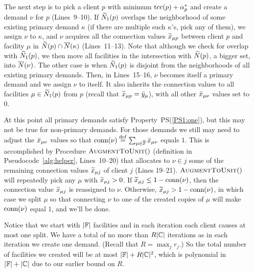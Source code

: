 \documentclass[11pt]{article}
\begin{document}


The next step is to pick a client $p$ with minimum
$\textrm{tcc}(p)+\alpha_p^\ast$ and create a demand $\nu$ for $p$
(Lines~9--10). If ${\widetilde N}_1(p)$ overlaps the neighborhood
of some existing primary demand $\kappa$ (if there are
multiple such $\kappa$'s, pick any of them), we assign $\nu$
to $\kappa$, and $\nu$ acquires all the connection values
${\widetilde x}_{\mu p}$ between client $p$ and facility $\mu$ in
${\widetilde N}(p)\cap {\overline{N}}(\kappa)$ (Lines~11--13). Note that
although we check for overlap with ${\widetilde N}_1(p)$, we then
move all facilities in the intersection with ${\widetilde N}(p)$,
a bigger set, into ${\overline{N}}(\nu)$.  The other case is when
${\widetilde N}_1(p)$ is disjoint from the neighborhoods of all
existing primary demands. Then, in Lines~15--16, $\nu$
becomes itself a primary demand and we assign $\nu$ to
itself. It also inherits the connection values to all
facilities $\mu\in{\widetilde N}_1(p)$ from $p$ (recall that
${\widetilde x}_{\mu p} = {\bar y}_{\mu}$), with all other
${\bar x}_{\mu\nu}$ values set to $0$.

At this point all primary demands satisfy
Property~PS(\ref{PS1:one}), but this may not be true for
non-primary demands. For those demands we still may need to
adjust the ${\bar x}_{\mu\nu}$ values so that ${\textrm{conn}}(\nu)
\stackrel{\mathrm{def}}{=}
\sum_{\mu\in\overline{\mathbb{F}}}{\bar x}_{\mu \nu}$ equals $1$. This
is accomplished by Procedure ${\textsc{AugmentToUnit}}()$ (definition
in Pseudocode~\ref{alg:helper}, Lines~10--20) that allocates
to $\nu\in j$ some of the remaining connection values
${\widetilde x}_{\mu j}$ of client $j$ (Lines 19--21).
${\textsc{AugmentToUnit}}()$ will repeatedly pick any $\mu$ with
${\widetilde x}_{\mu j} >0$.  If ${\widetilde x}_{\mu j} \leq
1-{\textrm{conn}}(\nu)$, then the connection value ${\widetilde x}_{\mu
  j}$ is reassigned to $\nu$. Otherwise, ${\widetilde x}_{\mu j} >
1-{\textrm{conn}}(\nu)$, in which case we split $\mu$ so that
connecting $\nu$ to one of the created copies of $\mu$ will
make ${\textrm{conn}}(\nu)$ equal $1$, and we'll be done.

\smallskip

Notice that we start with $|\mathbb{F}|$ facilities and in each
iteration each client causes at most one split. We have a total of no more
than $R|\mathbb{C}|$ iterations as in each iteration we create
one demand. (Recall that $R = \max_jr_j$.)
So the total number of facilities we created
will be at most $|\mathbb{F}|+ R|\mathbb{C}|^2$, which is
polynomial in $|\mathbb{F}|+|\mathbb{C}|$ due to our earlier bound on $R$.

\end{document}
